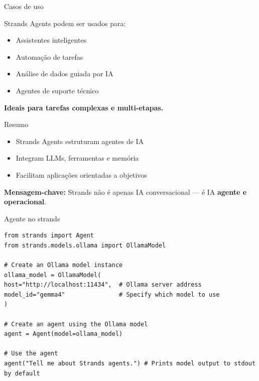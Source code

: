 \documentclass{beamer}
\begin{document}
\begin{frame}{Casos de uso}
    
    Strands Agents podem ser usados para:
    \begin{itemize}
        \item Assistentes inteligentes
        \item Automação de tarefas
        \item Análise de dados guiada por IA
        \item Agentes de suporte técnico
    \end{itemize}
    
    \vspace{0.3cm}
    
    \textbf{Ideais para tarefas complexas e multi-etapas.}
    
\end{frame}

\begin{frame}{Resumo}
    
    \begin{itemize}
        \item Strands Agents estruturam agentes de IA
        \item Integram LLMs, ferramentas e memória
        \item Facilitam aplicações orientadas a objetivos
    \end{itemize}
    
    \vspace{0.3cm}
    
    \textbf{Mensagem-chave:}  
    Strands não é apenas IA conversacional —  
    é IA \textbf{agente e operacional}.
    
\end{frame}

\begin{frame}[fragile]{Agente no strands}
	\begin{verbatim}
from strands import Agent
from strands.models.ollama import OllamaModel

# Create an Ollama model instance
ollama_model = OllamaModel(
host="http://localhost:11434",  # Ollama server address
model_id="gemma4"               # Specify which model to use
)

# Create an agent using the Ollama model
agent = Agent(model=ollama_model)

# Use the agent
agent("Tell me about Strands agents.") # Prints model output to stdout by default
	\end{verbatim}
\end{frame}
\end{document}
